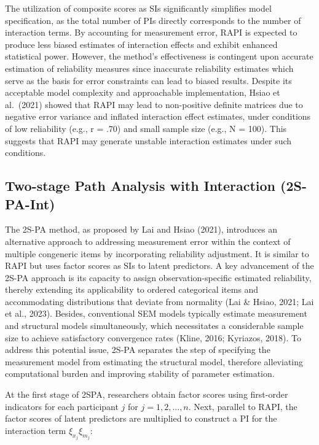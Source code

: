 \documentclass[
  man]{apa6}
\begin{document}
The utilization of composite scores as SIs significantly simplifies model specification, as the total number of PIs directly corresponds to the number of interaction terms. By accounting for measurement error, RAPI is expected to produce less biased estimates of interaction effects and exhibit enhanced statistical power. However, the method's effectiveness is contingent upon accurate estimation of reliability measures since inaccurate reliability estimates which serve as the basis for error constraints can lead to biased results. Despite its acceptable model complexity and approachable implementation, Hsiao et al.~(2021) showed that RAPI may lead to non-positive definite matrices due to negative error variance and inflated interaction effect estimates, under conditions of low reliability (e.g., r = .70) and small sample size (e.g., N = 100). This suggests that RAPI may generate unstable interaction estimates under such conditions.

\hypertarget{two-stage-path-analysis-with-interaction-2s-pa-int}{%
\subsection{Two-stage Path Analysis with Interaction (2S-PA-Int)}\label{two-stage-path-analysis-with-interaction-2s-pa-int}}

The 2S-PA method, as proposed by Lai and Hsiao (2021), introduces an alternative approach to addressing measurement error within the context of multiple congeneric items by incorporating reliability adjustment. It is similar to RAPI but uses factor scores as SIs to latent predictors. A key advancement of the 2S-PA approach is its capacity to assign observation-specific estimated reliability, thereby extending its applicability to ordered categorical items and accommodating distributions that deviate from normality (Lai \& Hsiao, 2021; Lai et al., 2023). Besides, conventional SEM models typically estimate measurement and structural models simultaneously, which necessitates a considerable sample size to achieve satisfactory convergence rates (Kline, 2016; Kyriazos, 2018). To address this potential issue, 2S-PA separates the step of specifying the measurement model from estimating the structural model, therefore alleviating computational burden and improving stability of parameter estimation.

At the first stage of 2SPA, researchers obtain factor scores using first-order indicators for each participant \(j\) for \(j = 1, 2, ..., n\). Next, parallel to RAPI, the factor scores of latent predictors are multiplied to construct a PI for the interaction term \(\xi_{x_{j}}\xi_{m_{j}}\):
\end{document}

